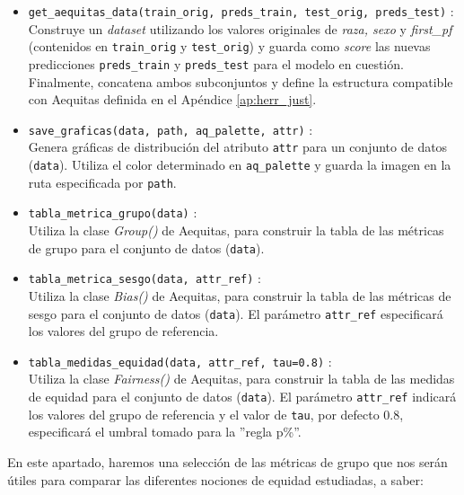 \documentclass[oneside,openright,titlepage,numbers=noenddot,openany,headinclude,footinclude=true,
cleardoublepage=empty,abstractoff,BCOR=5mm,paper=a4,fontsize=12pt,main=spanish]{scrreprt}
\begin{document}
\begin{itemize}
    \item \texttt{get\_aequitas\_data(train\_orig, preds\_train, test\_orig, preds\_test)} :\\
    Construye un \textit{dataset} utilizando los valores originales de \textit{raza, sexo} y \textit{first\_pf} (contenidos en \texttt{train\_orig} y \texttt{test\_orig}) y guarda como \textit{score} las nuevas predicciones \texttt{preds\_train} y \texttt{preds\_test} para el modelo en cuestión. Finalmente, concatena ambos subconjuntos y define la estructura compatible con Aequitas definida en el Apéndice \ref{ap:herr_just}.\\
    \item \texttt{save\_graficas(data, path, aq\_palette, attr)} :\\
    Genera gráficas de distribución del atributo \texttt{attr} para un conjunto de datos (\texttt{data}). Utiliza el color determinado en \texttt{aq\_palette} y guarda la imagen en la ruta especificada por \texttt{path}.\\
    \item \texttt{tabla\_metrica\_grupo(data)} :\\
    Utiliza la clase \textit{Group()} de Aequitas, para construir la tabla de las métricas de grupo para el conjunto de datos (\texttt{data}).\\
    \item \texttt{tabla\_metrica\_sesgo(data, attr\_ref)} :\\
    Utiliza la clase \textit{Bias()} de Aequitas, para construir la tabla de las métricas de sesgo para el conjunto de datos (\texttt{data}). El parámetro \texttt{attr\_ref} especificará los valores del grupo de referencia.\\
    \item \texttt{tabla\_medidas\_equidad(data, attr\_ref, tau=0.8)} :\\
    Utiliza la clase \textit{Fairness()} de Aequitas, para construir la tabla de las medidas de equidad para el conjunto de datos (\texttt{data}). El parámetro \texttt{attr\_ref} indicará los valores del grupo de referencia y el valor de \texttt{tau}, por defecto 0.8, especificará el umbral tomado para la ''regla p\%''.\\
\end{itemize}

En este apartado, haremos una selección de las métricas de grupo que nos serán útiles para comparar las diferentes nociones de equidad estudiadas, a saber:
\end{document}

